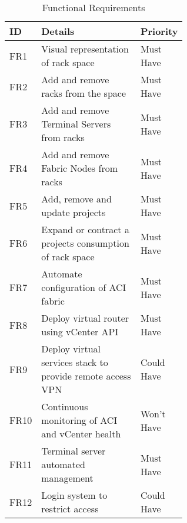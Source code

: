 \begin{table}[H]
        \centering
        \begin{tabular}{l p{0.6\linewidth} l}
            \hline
            \textbf{ID} & \textbf{Details}
                        & \textbf{Priority}
            \\ \hline
            FR1         & Visual representation of rack space
                        & Must Have
            \\ \hline
            FR2         & Add and remove racks from the space
                        & Must Have
            \\ \hline
            FR3         & Add and remove Terminal Servers from racks
                        & Must Have
            \\ \hline
            FR4         & Add and remove Fabric Nodes from racks
                        & Must Have
            \\ \hline
            FR5         & Add, remove and update projects
                        & Must Have
            \\ \hline
            FR6         & Expand or contract a projects consumption of rack
            space       & Must Have
            \\ \hline
            FR7         & Automate configuration of ACI fabric
                        & Must Have
            \\ \hline
            FR8         & Deploy virtual router using vCenter API
                        & Must Have
            \\ \hline
            FR9         & Deploy virtual services stack to provide remote
            access VPN  & Could
            Have
            \\ \hline
            FR10        & Continuous monitoring of ACI and vCenter health
                        & Won’t Have
            \\
            \hline
            FR11        & Terminal server automated management
                        & Must Have
            \\ \hline
            FR12        & Login system to restrict access                   & 
            Could Have                                                         \\
        \end{tabular}
        \caption{Functional Requirements}
        \label{requirements:functional}
    \end{table}

